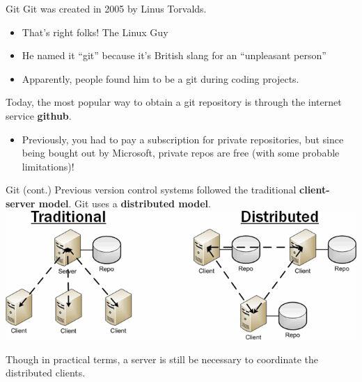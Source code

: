 \documentclass[11pt]{beamer}
\begin{document}
\begin{frame}{Git}
Git was created in 2005 by Linus Torvalds.\\ 
\begin{itemize}
\item That's right folks! The Linux Guy
\item He named it ``git'' because it's British slang for an ``unpleasant person''
\item Apparently, people found him to be a git during coding projects.  
\end{itemize}
Today, the most popular way to obtain a git repository is through the internet service \textbf{github}.  
\begin{itemize}
\item Previously, you had to pay a subscription for private repositories, but since being bought out by Microsoft, private repos are free (with some probable limitations)! 
\end{itemize}
\end{frame}

\begin{frame}{Git (cont.)}
Previous version control systems followed the traditional \textbf{client-server model}. Git uses a \textbf{distributed model}. \\ 
\vspace{1em}
\includegraphics[scale=0.4]{traddist.png}

Though in practical terms, a server is still be necessary to coordinate the distributed clients.  
\end{frame}
\end{document}
